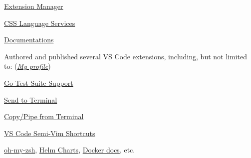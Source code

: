 \documentclass[9pt,a4paper]{extarticle}
\begin{document}
\begin{customitemize}
\begin{customitemize}
\begin{customitemize}
\begin{customitemize}
                \item{\href{https://github.com/microsoft/vscode-vsce/pulls?q=is\%3Apr+author\%3Ababakks}{Extension Manager }}
                \item{\href{https://github.com/microsoft/vscode-css-languageservice/pulls?q=is\%3Apr+author\%3Ababakks}{CSS Language Services }}
                \item{\href{https://github.com/microsoft/vscode-docs/pulls?q=is\%3Apr+author\%3Ababakks}{Documentations }}
            \end{customitemize}
            \item{Authored and published several VS Code extensions, including, but not limited to: (\href{https://marketplace.visualstudio.com/publishers/babakks}{\textit{My profile}})}
            \begin{customitemize}
                \item{\href{https://marketplace.visualstudio.com/items?itemName=babakks.vscode-go-test-suite}{Go Test Suite Support} }
                \item{\href{https://marketplace.visualstudio.com/items?itemName=babakks.vscode-send-to-terminal}{Send to Terminal} }
                \item{\href{https://marketplace.visualstudio.com/items?itemName=babakks.vscode-copy-from-terminal}{Copy/Pipe from Terminal} }
                \item{\href{https://marketplace.visualstudio.com/items?itemName=babakks.vscode-vim-shortcuts}{VS Code Semi-Vim Shortcuts} }
            \end{customitemize}
        \end{customitemize}
        \item {}
        \begin{customitemize}
            \item{
            \href{https://github.com/ohmyzsh/ohmyzsh/pulls?q=author\%3Ababakks}{oh-my-zsh},
            \href{https://github.com/helm/charts/pulls?q=is\%3Apr+author%3Ababakks}{Helm Charts},
                \href{https://github.com/docker-library/docs/pulls?q=is\%3Apr+author\%3Ababakks}{Docker docs},
                etc.
            }
        \end{customitemize}
    \end{customitemize}


\end{customitemize}
\end{document}
